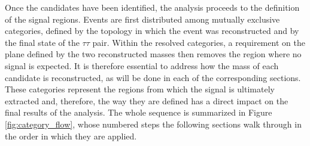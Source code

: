 Once the candidates have been identified, the analysis proceeds to the definition of the signal regions. Events are first distributed among mutually exclusive categories, defined by the topology in which the event was reconstructed and by the final state of the $\tau\tau$ pair. Within the resolved categories, a requirement on the plane defined by the two reconstructed masses then removes the region where no signal is expected. It is therefore essential to address how the mass of each candidate is reconstructed, as will be done in each of the corresponding sections. These categories represent the regions from which the signal is ultimately extracted and, therefore, the way they are defined has a direct impact on the final results of the analysis. The whole sequence is summarized in Figure \ref{fig:category_flow}, whose numbered steps the following sections walk through in the order in which they are applied.
%
